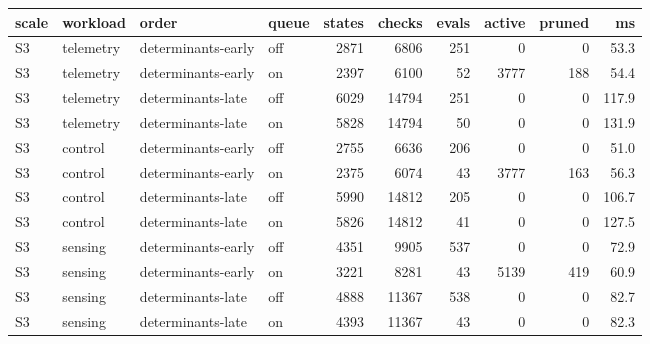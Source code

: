 \scriptsize
\begin{tabular}{llllrrrrrr}
\toprule
scale & workload & order & queue & states & checks & evals & active & pruned & ms \\
\midrule
S3 & telemetry & determinants-early & off & 2871 & 6806 & 251 & 0 & 0 & 53.3 \\
S3 & telemetry & determinants-early & on & 2397 & 6100 & 52 & 3777 & 188 & 54.4 \\
S3 & telemetry & determinants-late & off & 6029 & 14794 & 251 & 0 & 0 & 117.9 \\
S3 & telemetry & determinants-late & on & 5828 & 14794 & 50 & 0 & 0 & 131.9 \\
S3 & control & determinants-early & off & 2755 & 6636 & 206 & 0 & 0 & 51.0 \\
S3 & control & determinants-early & on & 2375 & 6074 & 43 & 3777 & 163 & 56.3 \\
S3 & control & determinants-late & off & 5990 & 14812 & 205 & 0 & 0 & 106.7 \\
S3 & control & determinants-late & on & 5826 & 14812 & 41 & 0 & 0 & 127.5 \\
S3 & sensing & determinants-early & off & 4351 & 9905 & 537 & 0 & 0 & 72.9 \\
S3 & sensing & determinants-early & on & 3221 & 8281 & 43 & 5139 & 419 & 60.9 \\
S3 & sensing & determinants-late & off & 4888 & 11367 & 538 & 0 & 0 & 82.7 \\
S3 & sensing & determinants-late & on & 4393 & 11367 & 43 & 0 & 0 & 82.3 \\
\bottomrule
\end{tabular}
